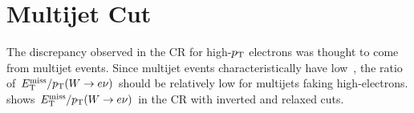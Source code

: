 \section{Multijet Cut}
\label{ch:qcd:mjcut}
The discrepancy observed in the \Wjets CR for high-$p_{\text{T}}$ electrons was thought to come from multijet events. Since multijet events characteristically have low \MET, the ratio of $E_{\text{T}}^{\text{miss}}/p_{\text{T}}(W\rightarrow e\nu)$ should be relatively low for multijets faking high-\pT electrons. \Fig{\ref{fig:qcd_reg}} shows $E_{\text{T}}^{\text{miss}}/p_{\text{T}}(W\rightarrow e\nu)$ in the \Wjets CR with inverted and relaxed \MET cuts.  
\begin{figure}[h!tb]
\centering
{}
\\

\end{figure}
